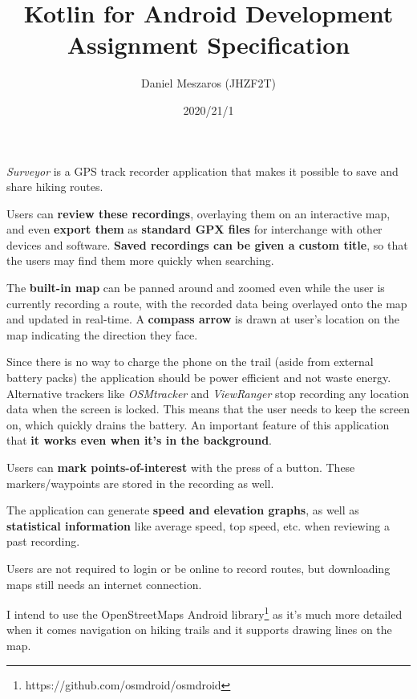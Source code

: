 \documentclass{exam}
\begin{document}
\title{Kotlin for Android Development Assignment Specification}
\author{Daniel Meszaros (JHZF2T)}
\date{2020/21/1}

\emph{Surveyor} is a GPS track recorder application that makes it
possible to save and share hiking routes.

Users can \textbf{review these recordings}, overlaying them on an interactive
map, and even \textbf{export them} as \textbf{standard GPX files} for
interchange with other devices and software.
\textbf{Saved recordings can be given a custom title}, so that the users may
find them more quickly when searching.

The \textbf{built-in map} can be panned around and zoomed even while the user is
currently recording a route, with the recorded data being overlayed onto the map
and updated in real-time.
A \textbf{compass arrow} is drawn at user's location on the map indicating the
direction they face.

Since there is no way to charge the phone on the trail (aside from external
battery packs) the application should be power efficient and not waste energy.
Alternative trackers like \emph{OSMtracker} and \emph{ViewRanger} stop recording
any location data when the screen is locked.
This means that the user needs to keep the screen on, which quickly drains the
battery.
An important feature of this application that \textbf{it works even when it's
in the background}.

Users can \textbf{mark points-of-interest} with the press of a button. These
markers/waypoints are stored in the recording as well.

The application can generate \textbf{speed and elevation graphs}, as well as
\textbf{statistical information} like average speed, top speed, etc. when
reviewing a past recording.

Users are not required to login or be online to record routes, but
downloading maps still needs an internet connection.

I intend to use the OpenStreetMaps Android
library\footnote{https://github.com/osmdroid/osmdroid} as it's much more
detailed when it comes navigation on hiking trails and it supports drawing lines
on the map.
\end{document}

